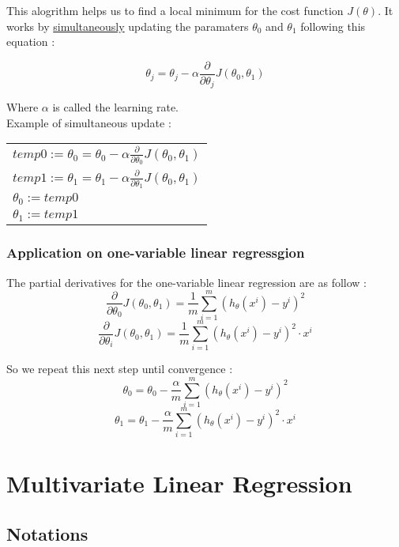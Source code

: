 \documentclass{article}
\begin{document}
This alogrithm helps us to find a local minimum for the cost function $J(\theta)$. It works by \underline{simultaneously} updating the paramaters $\theta_0$ and $\theta_1$ following this equation :
\begin{center}
	$$\theta_j =  \theta_j - \alpha \frac{\partial}{\partial\theta_j}J(\theta_0, \theta_1)$$
\end{center}
Where $\alpha$ is called the learning rate.\\
Example of simultaneous update :

\begin{center}
	
	\begin{tabular}{l}
		
		$temp0 := \theta_0 =  \theta_0 - \alpha \frac{\partial}{\partial\theta_0}J(\theta_0, \theta_1)$\\
		$temp1 := \theta_1 =  \theta_1 - \alpha \frac{\partial}{\partial\theta_1}J(\theta_0, \theta_1)$\\
		$\theta_0 := temp0$\\
		$\theta_1 := temp1$
		
	\end{tabular}

\end{center}

\subsubsection{Application on one-variable linear regressgion}
The partial derivatives for the one-variable linear regression are as follow : 
$$\frac{\partial}{\partial\theta_0}J(\theta_0, \theta_1) = \frac{1}{m}\sum_{i = 1}^{m}(h_\theta(x^i) - y^i)^2$$
$$\frac{\partial}{\partial\theta_i}J(\theta_0, \theta_1) = \frac{1}{m}\sum_{i = 1}^{m}(h_\theta(x^i) - y^i)^2 \cdot x^i$$

So we repeat this next step until convergence :
$$\theta_0 = \theta_0 - \frac{\alpha}{m}\sum_{i = 1}^{m}(h_\theta(x^i) - y^i)^2$$
$$\theta_1 = \theta_1 - \frac{\alpha}{m}\sum_{i = 1}^{m}(h_\theta(x^i) - y^i)^2 \cdot x^i$$


\section{Multivariate Linear Regression}
\subsection{Notations}
\end{document}

